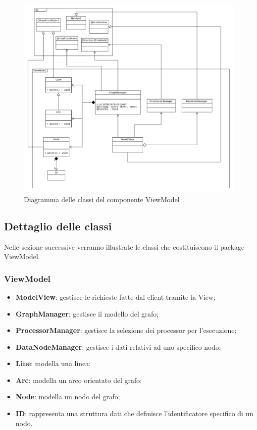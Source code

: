 \documentclass[openany,12pt,a4paper]{report}
\begin{document}
\begin{figure}[H]
	\includegraphics[scale=0.5]{ViewModelDiagram}
	\centering
	\caption{Diagramma delle classi del componente ViewModel}
\end{figure}

\subsection{Dettaglio delle classi}

Nelle sezione successive verranno illustrate le classi che costituiscono il package ViewModel.

\subsubsection{ViewModel}

\begin{itemize}
	\item \textbf{ModelView}: gestisce le richieste fatte dal client tramite la View;
	\item \textbf{GraphManager}: gestisce il modello del grafo;
	\item \textbf{ProcessorManager}: gestisce la selezione dei processor per l'esecuzione;
	\item \textbf{DataNodeManager}: gestisce i dati relativi ad uno specifico nodo;
	\item \textbf{Line}: modella una linea;
	\item \textbf{Arc}: modella un arco orientato del grafo;
	\item \textbf{Node}: modella un nodo del grafo;
	\item \textbf{ID}:  rappresenta una struttura dati che definisce l'identificatore specifico di un nodo.
\end{itemize}
\end{document}

